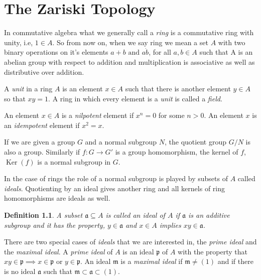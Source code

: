 \documentclass[]{report}
\newtheorem{defn}[theorem]{Definition}
\DeclareMathOperator\Ker{Ker}
\begin{document}
\chapter {The Zariski Topology}

In commutative algebra what we generally call a \textit{ring} is a commutative ring with unity, i.e, $1\in A$. So from now on, when we say ring we mean a set $A$ with two binary operations on it's elements $a + b \text{ and } a\dot b$, for all $a,b\in A$ such that A is an abelian group with respect to addition and multiplication is associative as well as distributive over addition.

A \textit{unit} in a ring $A$ is an element $x\in A$ such that there is another element $y\in A$ so that $xy = 1$. A ring in which every element is a \textit{unit} is called a \textit{field}. 

An element $x\in A$ is a \textit{nilpotent} element if $x^n = 0$ for some $n>0$. An element $x$ is an \textit{idempotent} element if $x^2 = x$. 

If we are given a group $G$ and a normal subgroup $N$, the quotient group $G/N$ is also a group. Similarly if $f: G \rightarrow G'$ is a group homomorphism, the kernel of $f$, $\Ker(f)$ is a normal subgroup in $G$. 

In the case of rings the role of a normal subgroup is played by subsets of $A$ called \textit{ideals}. Quotienting by an ideal gives another ring and all kernels of ring homomorphisms are ideals as well.

\begin{defn}
    A subset $\mathfrak{a} \subseteq A$ is called an \textit{ideal} of $A$ if $\mathfrak{a}$ is an additive subgroup and it has the property, $y\in \mathfrak{a}$ and $x\in A$ implies $xy\in \mathfrak{a}$.
\end{defn}

 There are two special cases of \textit{ideals} that we are interested in, the \textit{prime ideal} and the \textit{maximal ideal}. A \textit{prime ideal} of $A$  is an ideal $\mathfrak{p}$ of $A$ with the property that $xy\in \mathfrak{p} \implies x \in \mathfrak{p} \text{ or } y\in \mathfrak{p}$. An ideal $\mathfrak{m}$ is a \textit{maximal ideal} if $\mathfrak{m} \neq (1)$ and if there is no ideal $\mathfrak{a}$ such that $\mathfrak{m\subset a\subset} (1)$. 
\end{document}
